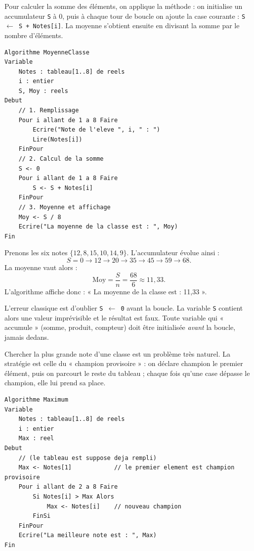 \documentclass[11pt]{article}
\newcounter{popsec}
\newcounter{popsub}
\newcommand{\courssub}[1]{%
  \stepcounter{popsub}%
  \par\vspace{9pt}\noindent{\popxbold\fontsize{11.5}{13}\selectfont\color{popink}{\color{poporange}\thepopsec.\thepopsub}\hspace{6pt}#1}\par\nopagebreak\vspace{4pt}
}
\begin{document}
Pour calculer la somme des éléments, on applique la méthode : on initialise un accumulateur \texttt{S} à 0, puis à chaque tour de boucle on ajoute la case courante : \texttt{S $\leftarrow$ S + Notes[i]}. La moyenne s'obtient ensuite en divisant la somme par le nombre d'éléments.

\begin{lstlisting}
Algorithme MoyenneClasse
Variable
    Notes : tableau[1..8] de reels
    i : entier
    S, Moy : reels
Debut
    // 1. Remplissage
    Pour i allant de 1 a 8 Faire
        Ecrire("Note de l'eleve ", i, " : ")
        Lire(Notes[i])
    FinPour
    // 2. Calcul de la somme
    S <- 0
    Pour i allant de 1 a 8 Faire
        S <- S + Notes[i]
    FinPour
    // 3. Moyenne et affichage
    Moy <- S / 8
    Ecrire("La moyenne de la classe est : ", Moy)
Fin
\end{lstlisting}

\begin{exemplebox}
Prenons les six notes $\{12, 8, 15, 10, 14, 9\}$. L'accumulateur évolue ainsi :
\[ S = 0 \to 12 \to 20 \to 35 \to 45 \to 59 \to 68. \]
La moyenne vaut alors :
\[ \text{Moy} = \frac{S}{n} = \frac{68}{6} \approx 11{,}33. \]
L'algorithme affiche donc : « La moyenne de la classe est : 11,33 ».
\end{exemplebox}

\begin{attention}
L'erreur classique est d'oublier \texttt{S $\leftarrow$ 0} avant la boucle. La variable \texttt{S} contient alors une valeur imprévisible et le résultat est faux. Toute variable qui « accumule » (somme, produit, compteur) doit être initialisée \emph{avant} la boucle, jamais dedans.
\end{attention}

\courssub{Recherche du maximum et du minimum}

Chercher la plus grande note d'une classe est un problème très naturel. La stratégie est celle du « champion provisoire » : on déclare champion le premier élément, puis on parcourt le reste du tableau ; chaque fois qu'une case dépasse le champion, elle lui prend sa place.

\begin{lstlisting}
Algorithme Maximum
Variable
    Notes : tableau[1..8] de reels
    i : entier
    Max : reel
Debut
    // (le tableau est suppose deja rempli)
    Max <- Notes[1]            // le premier element est champion provisoire
    Pour i allant de 2 a 8 Faire
        Si Notes[i] > Max Alors
            Max <- Notes[i]    // nouveau champion
        FinSi
    FinPour
    Ecrire("La meilleure note est : ", Max)
Fin
\end{lstlisting}
\end{document}
